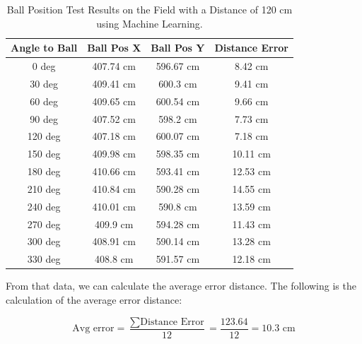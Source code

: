 
\begin{table}[H]
  \caption{Ball Position Test Results on the Field with a Distance of 120 cm using Machine Learning.}
  \begin{center}
    \begin{tabular}{|c|c|c|c|}
      \hline
    \rowcolor[HTML]{C0C0C0}
  \textbf{Angle to Ball} & \textbf{Ball Pos X} & \textbf{Ball Pos Y} & \textbf{Distance Error} \\
  \hline
  0 deg            & 407.74 cm                & 596.67 cm    & 8.42 cm        \\
  30 deg           & 409.41 cm                & 600.3 cm     & 9.41 cm        \\
  60 deg           & 409.65 cm                & 600.54 cm    & 9.66 cm         \\
  90 deg           & 407.52 cm                & 598.2 cm      & 7.73 cm      \\
  120 deg           & 407.18 cm                & 600.07 cm    & 7.18 cm        \\
  150 deg           & 409.98 cm                & 598.35 cm     & 10.11 cm       \\
  180 deg           & 410.66 cm                & 593.41 cm     & 12.53 cm       \\
  210 deg           & 410.84 cm                & 590.28 cm    & 14.55 cm        \\
  240 deg           & 410.01 cm                & 590.8 cm     & 13.59 cm      \\
  270 deg           & 409.9 cm                & 594.28 cm     & 11.43 cm      \\
  300 deg           & 408.91 cm                & 590.14 cm    & 13.28 cm       \\
  330 deg           & 408.8 cm                & 591.57 cm    & 12.18 cm       \\
  \hline
\end{tabular}
\end{center}
\end{table}


From that data, we can calculate the average error distance. The following is the calculation of the average error distance:

\begin{equation}
  \text{Avg error} = \frac{\sum \text{Distance Error}}{12} = \frac{123.64}{12} = 10.3 \text{ cm}
\end{equation}

